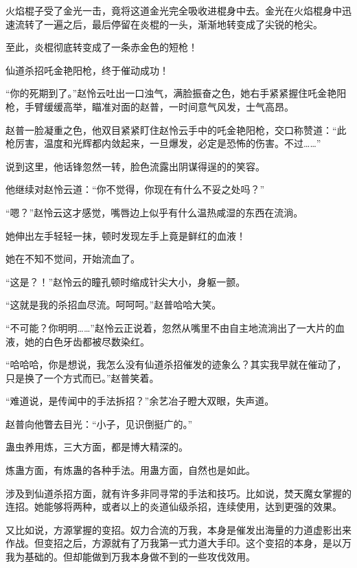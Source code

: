 
\begin{this_body}



火焰棍子受了金光一击，竟将这道金光完全吸收进棍身中去。金光在火焰棍身中迅速流转了一遍之后，最后停留在炎棍的一头，渐渐地转变成了尖锐的枪尖。

至此，炎棍彻底转变成了一条赤金色的短枪！

仙道杀招吒金艳阳枪，终于催动成功！

“你的死期到了。”赵怜云吐出一口浊气，满脸振奋之色，她右手紧紧握住吒金艳阳枪，手臂缓缓高举，瞄准对面的赵普，一时间意气风发，士气高昂。

赵普一脸凝重之色，他双目紧紧盯住赵怜云手中的吒金艳阳枪，交口称赞道：“此枪厉害，温度和光辉都内敛起来，一旦爆发，必定是恐怖的伤害。不过……”

说到这里，他话锋忽然一转，脸色流露出阴谋得逞的的笑容。

他继续对赵怜云道：“你不觉得，你现在有什么不妥之处吗？”

“嗯？”赵怜云这才感觉，嘴唇边上似乎有什么温热咸湿的东西在流淌。

她伸出左手轻轻一抹，顿时发现左手上竟是鲜红的血液！

她在不知不觉间，开始流血了。

“这是？！”赵怜云的瞳孔顿时缩成针尖大小，身躯一颤。

“这就是我的杀招血尽流。呵呵呵。”赵普哈哈大笑。

“不可能？你明明……”赵怜云正说着，忽然从嘴里不由自主地流淌出了一大片的血液，她的白色牙齿都被尽数染红。

“哈哈哈，你是想说，我怎么没有仙道杀招催发的迹象么？其实我早就在催动了，只是换了一个方式而已。”赵普笑着。

“难道说，是传闻中的手法拆招？”余艺冶子瞪大双眼，失声道。

赵普向他瞥去目光：“小子，见识倒挺广的。”

蛊虫养用炼，三大方面，都是博大精深的。

炼蛊方面，有炼蛊的各种手法。用蛊方面，自然也是如此。

涉及到仙道杀招方面，就有许多非同寻常的手法和技巧。比如说，焚天魔女掌握的连招。她能够将两种，或者以上的炎道仙级杀招，连续使用，达到更强的效果。

又比如说，方源掌握的变招。奴力合流的万我，本身是催发出海量的力道虚影出来作战。但变招之后，方源就有了万我第一式力道大手印。这个变招的本身，是以万我为基础的。但却能做到万我本身做不到的一些攻伐效用。


\end{this_body}
